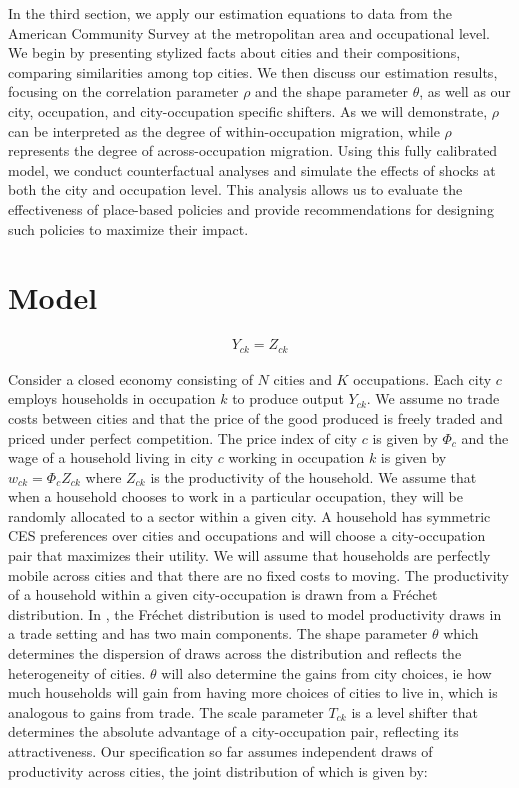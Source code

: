 \documentclass[10pt]{article}
\begin{document}
In the third section, we apply our estimation equations to data from the American Community Survey at the metropolitan area and occupational level. We begin by presenting stylized facts about cities and their compositions, comparing similarities among top cities. We then discuss our estimation results, focusing on the correlation parameter $\rho$ and the shape parameter $\theta$, as well as our city, occupation, and city-occupation specific shifters. As we will demonstrate, $\rho$ can be interpreted as the degree of within-occupation migration, while $\rho$ represents the degree of across-occupation migration. Using this fully calibrated model, we conduct counterfactual analyses and simulate the effects of shocks at both the city and occupation level. This analysis allows us to evaluate the effectiveness of place-based policies and provide recommendations for designing such policies to maximize their impact.

\section{Model}

\begin{align*}
    Y_{ck} = Z_{ck}
\end{align*}

Consider a closed economy consisting of $N$ cities and $K$ occupations. Each city $c$ employs households in occupation $k$ to produce output $Y_{ck}$. We assume no trade costs between cities and that the price of the good produced is freely traded and priced under perfect competition. The price index of city $c$ is given by $\Phi_c$ and the wage of a household living in city $c$ working in occupation $k$ is given by $w_{ck} = \Phi_c Z_{ck}$ where $Z_{ck}$ is the productivity of the household. We assume that when a household chooses to work in a particular occupation, they will be randomly allocated to a sector within a given city. A household has symmetric CES preferences over cities and occupations and will choose a city-occupation pair that maximizes their utility. We will assume that households are perfectly mobile across cities and that there are no fixed costs to moving. The productivity of a household within a given city-occupation is drawn from a Fr\'{e}chet distribution. In \cite{ek}, the Fr\'{e}chet distribution is used to model productivity draws in a trade setting and has two main components. The shape parameter $\theta$ which determines the dispersion of draws across the distribution and reflects the heterogeneity of cities. $\theta$ will also determine the gains from city choices, ie how much households will gain from having more choices of cities to live in, which is analogous to gains from trade. The scale parameter $T_{ck}$ is a level shifter that determines the absolute advantage of a city-occupation pair, reflecting its attractiveness. Our specification so far assumes independent draws of productivity across cities, the joint distribution of which is given by:
\end{document}
